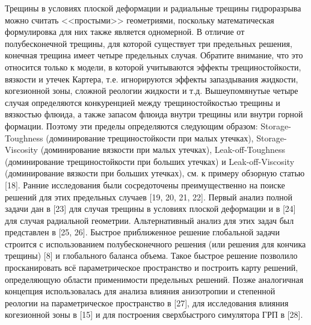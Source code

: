 \documentclass[main.tex]{subfiles}
\begin{document}
Трещины в условиях плоской деформации и радиальные трещины гидроразрыва можно считать <<простыми>> геометриями, поскольку математическая формулировка для них также является одномерной.
В отличие от полубесконечной трещины, для которой существует три предельных решения, конечная трещина имеет четыре предельных случая.
Обратите внимание, что это относится только к модели, в которой учитываются эффекты трещиностойкости, вязкости и утечек Картера, т.е. игнорируются эффекты запаздывания жидкости, когезионной зоны, сложной реологии жидкости и т.д.
Вышеупомянутые четыре случая определяются конкуренцией между трещиностойкостью трещины и вязкостью флюида, а также запасом флюида внутри трещины или внутри горной формации.
Поэтому эти пределы определяются следующим образом: Storage-Toughness (доминирование трещиностойкости при малых утечках), Storage-Viscosity (доминирование вязкости при малых утечках), Leak-off-Toughness (доминирование трещиностойкости при больших утечках) и Leak-off-Viscosity (доминирование вязкости при больших утечках), см. к примеру обзорную статью [18].
Ранние исследования были сосредоточены преимущественно на поиске решений для этих предельных случаев [19, 20, 21, 22].
Первый анализ полной задачи дан в [23] для случая трещины в условиях плоской деформации и в [24] для случая радиальной геометрии.
Альтернативный анализ для этих задач был представлен в [25, 26].
Быстрое приближенное решение глобальной задачи строится с использованием полубесконечного решения (или решения для кончика трещины) [8] и глобального баланса объема.
Такое быстрое решение позволило просканировать всё параметрическое пространство и построить карту решений, определяющую области применимости предельных решений.
Позже аналогичная концепция использовалась для анализа влияния анизотропии и степенной реологии на параметрическое пространство в [27], для исследования влияния когезионной зоны в [15] и для построения сверхбыстрого симулятора ГРП в [28].
\end{document}
